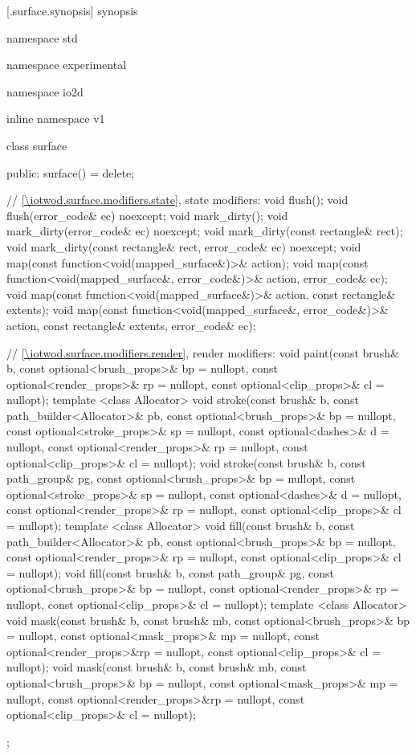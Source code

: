 [\iotwod.surface.synopsis] { synopsis}

\begin{codeblock}
namespace std { namespace experimental { namespace io2d { inline namespace v1 {
  class surface {
  public:
    surface() = delete;
    
    // \ref{\iotwod.surface.modifiers.state}, state modifiers:
    void flush();
    void flush(error_code& ec) noexcept;
    void mark_dirty();
    void mark_dirty(error_code& ec) noexcept;
    void mark_dirty(const rectangle& rect);
    void mark_dirty(const rectangle& rect, error_code& ec) noexcept;
    void map(const function<void(mapped_surface&)>& action);
    void map(const function<void(mapped_surface&, error_code&)>& action,
      error_code& ec);
    void map(const function<void(mapped_surface&)>& action,
      const rectangle& extents);
    void map(const function<void(mapped_surface&, error_code&)>& action,
      const rectangle& extents, error_code& ec);

    // \ref{\iotwod.surface.modifiers.render}, render modifiers:
    void paint(const brush& b, const optional<brush_props>& bp = nullopt,
      const optional<render_props>& rp = nullopt,
      const optional<clip_props>& cl = nullopt);
    template <class Allocator>
    void stroke(const brush& b, const path_builder<Allocator>& pb,
      const optional<brush_props>& bp = nullopt,
      const optional<stroke_props>& sp = nullopt,
      const optional<dashes>& d = nullopt,
      const optional<render_props>& rp = nullopt,
      const optional<clip_props>& cl = nullopt);
    void stroke(const brush& b, const path_group& pg,
      const optional<brush_props>& bp = nullopt,
      const optional<stroke_props>& sp = nullopt,
      const optional<dashes>& d = nullopt,
      const optional<render_props>& rp = nullopt,
      const optional<clip_props>& cl = nullopt);
    template <class Allocator>
    void fill(const brush& b, const path_builder<Allocator>& pb,
      const optional<brush_props>& bp = nullopt,
      const optional<render_props>& rp = nullopt,
      const optional<clip_props>& cl = nullopt);
    void fill(const brush& b, const path_group& pg,
      const optional<brush_props>& bp = nullopt,
      const optional<render_props>& rp = nullopt,
      const optional<clip_props>& cl = nullopt);
    template <class Allocator>
    void mask(const brush& b, const brush& mb,
      const optional<brush_props>& bp = nullopt,
      const optional<mask_props>& mp = nullopt,
      const optional<render_props>&rp = nullopt,
      const optional<clip_props>& cl = nullopt);
    void mask(const brush& b, const brush& mb,
      const optional<brush_props>& bp = nullopt,
      const optional<mask_props>& mp = nullopt,
      const optional<render_props>&rp = nullopt,
      const optional<clip_props>& cl = nullopt);
  };
} } } }
\end{codeblock}

